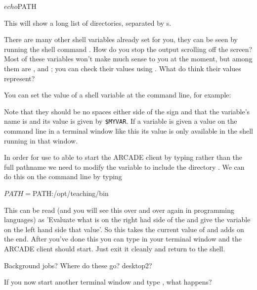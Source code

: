 \begin{ttoutenv}
  $ echo $PATH
\end{ttoutenv}

This will show a long list of directories, separated by \ttout{:}s.

There are many other shell variables already set for you, they can be seen by running the shell command . How do you stop the output scrolling off the screen? Most of these variables won't make much sense to you at the moment, but among them are ,  and ; you can check their values using . What do think their values represent?

You can set the value of a shell variable at the command line, for example:


Note that they should be no spaces either side of the \ttout{=} sign and that the variable's name is  and its value is given by \verb+$MYVAR+. If a variable is given a value on the command line in a terminal window like this its value is only available in the shell running in that window.

In order for use to able to start the ARCADE client by typing  rather than the full pathname  we need to modify the  variable to include the directory . We can do this on the command line by typing

\begin{ttoutenv}
  $ PATH=$PATH:/opt/teaching/bin
\end{ttoutenv}

This can be read (and you will see this over and over again in programming languages) as 'Evaluate what is on the right had side of the \ttout{=} and give the variable on the left hand side that value'. So this takes the current value of  and adds  on the end. After you've done this you can type  in your terminal window and the ARCADE client should start. Just exit it cleanly and return to the shell.

\begin{note}
  Background jobs? Where do these go? desktop2?
\end{note}

If you now start another terminal window and type , what happens?

